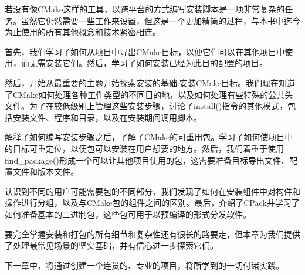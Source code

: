 若没有像CMake这样的工具，以跨平台的方式编写安装脚本是一项非常复杂的任务。虽然它仍然需要一些工作来设置，但这是一个更加精简的过程，与本书中迄今为止使用的所有其他概念和技术紧密相连。

首先，我们学习了如何从项目中导出CMake目标，以便它们可以在其他项目中使用，而无需安装它们。然后，学习了如何安装已经为此目的配置的项目。

然后，开始从最重要的主题开始探索安装的基础:安装CMake目标。我们现在知道了CMake如何处理各种工件类型的不同目的地，以及如何处理有些特殊的公共头文件。为了在较低级别上管理这些安装步骤，讨论了install()指令的其他模式，包括安装文件、程序和目录，以及在安装期间调用脚本。

解释了如何编写安装步骤之后，了解了CMake的可重用包。学习了如何使项目中的目标可重定位，以便包可以安装在用户想要的地方。然后，我们着重于使用find\_package()形成一个可以让其他项目使用的包，这需要准备目标导出文件、配置文件和版本文件。

认识到不同的用户可能需要包的不同部分，我们发现了如何在安装组件中对构件和操作进行分组，以及与CMake包的组件之间的区别。最后，介绍了CPack并学习了如何准备基本的二进制包，这些包可用于以预编译的形式分发软件。

要完全掌握安装和打包的所有细节和复杂性还有很长的路要走，但本章为我们提供了处理最常见场景的坚实基础，并有信心进一步探索它们。

下一章中，将通过创建一个连贯的、专业的项目，将所学到的一切付诸实践。








